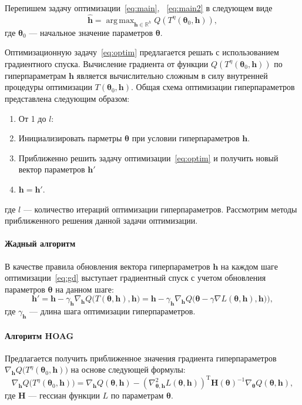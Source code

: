 \documentclass[12pt]{article}
\DeclareMathOperator*{\argmax}{arg\,max}
\begin{document}
Перепишем задачу оптимизации~\eqref{eq:main}, ~\eqref{eq:main2} в следующем виде
\begin{equation}
\label{eq:optim}
	\hat{\mathbf{h}} = \argmax_{\mathbf{h} \in \mathbb{R}^h} Q( T^\eta(\boldsymbol{\theta}_0, \mathbf{h})),
\end{equation}
где $\boldsymbol{\theta}_0$ --- начальное значение параметров $\boldsymbol{\theta}$.

Оптимизационную задачу~\eqref{eq:optim} предлагается решать с использованием градиентного спуска. Вычисление градиента от функции $Q( T^\eta(\boldsymbol{\theta}_0, \mathbf{h}))$ по гиперпараметрам $\mathbf{h}$ является вычислительно сложным в силу внутренней процедуры оптимизации $T(\boldsymbol{\theta}_0, \mathbf{h})$. 
Общая схема  оптимизации гиперпараметров представлена следующим образом:
\begin{enumerate}
\item От 1 до  $l$:
\item Инициализировать парметры $\boldsymbol{\theta}$ при условии гиперпараметров $\mathbf{h}$.
\item Приближенно решить задачу оптимизации~\eqref{eq:optim} и получить новый вектор параметров $\mathbf{h}'$
\item $\mathbf{h} = \mathbf{h}'$.
\end{enumerate}
где $l$ --- количество итераций оптимизации гиперпараметров. Рассмотрим методы приближенного решения данной задачи оптимизации.



\paragraph{Жадный алгоритм}
В качестве  правила обновления вектора гиперпараметров $\mathbf{h}$ на каждом шаге оптимизации~\eqref{eq:gd} выступает градиентный спуск с учетом обновления параметров $\boldsymbol{\theta}$ на данном шаге:
\[
	\mathbf{h}' = \mathbf{h} - \gamma_{\mathbf{h}} \nabla_{\mathbf{h}}  Q \bigl(T(\boldsymbol{\theta}, \mathbf{h}) , \mathbf{h}\bigr) = \mathbf{h} - \gamma_{\mathbf{h}} \nabla_{\mathbf{h}}  Q\bigl(\boldsymbol{\theta} - \gamma \nabla L(\boldsymbol{\theta}, \mathbf{h}), \mathbf{h})\bigr),
\]
где $\gamma_{\mathbf{h}}$ --- длина шага оптимизации гиперпараметров.

\paragraph{Алгоритм HOAG}
Предлагается получить приближенное значения градиента гиперпараметров $\nabla_{\mathbf{h}} Q \bigl(T^\eta(\boldsymbol{\theta}_0, \mathbf{h})\bigr)$ на основе следующей формулы:
\[
\nabla_{\mathbf{h}} Q \bigl(T^\eta(\boldsymbol{\theta}_0, \mathbf{h})\bigr) = \nabla_{\mathbf{h}} Q(\boldsymbol{\theta}, \mathbf{h}) - (\nabla^2_{\boldsymbol{\theta}, \mathbf{h}} L(\boldsymbol{\theta}, \mathbf{h}))^\text{T}\mathbf{H}(\boldsymbol{\theta})^{-1}\nabla_{\boldsymbol{\theta}} Q(\boldsymbol{\theta}, \mathbf{h}),
\]
где $\mathbf{H}$ --- гессиан функции $L$ по параметрам $\boldsymbol{\theta}$.
\end{document}
